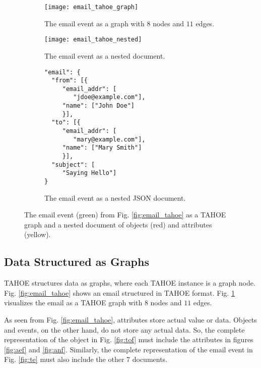 \begin{figure}
    \begin{subfigure}{0.45\textwidth}
        \centering
        \texttt{[image: email\_tahoe\_graph]}
        \caption{The email event as a graph with $8$ nodes and $11$ edges.}
        \label{fig:email_tahoe_graph}
    \end{subfigure}
    \hfill
    \begin{subfigure}{0.23\textwidth}
        \centering
        \texttt{[image: email\_tahoe\_nested]}
        \caption{The email event as a nested document.}
        \label{fig:email_tahoe_nested}
    \end{subfigure}
    \hfill
    \captionsetup[subfigure]{aboveskip=-0.5\baselineskip}
    \begin{subfigure}{0.26\textwidth}
        \footnotesize

        \begin{verbatim}
"email": {
  "from": [{
     "email_addr": [
        "jdoe@example.com"],
     "name": ["John Doe"]
     }],
  "to": [{
     "email_addr": [
        "mary@example.com"],
     "name": ["Mary Smith"]
     }],
  "subject": [
     "Saying Hello"]
}
        \end{verbatim}

        \caption{The email event as a nested JSON document.}
        \label{fig:email_tahoe_data}
    \end{subfigure}
    \caption{The email event (green) from Fig. \ref{fig:email_tahoe} as a TAHOE graph and a nested document of objects (red) and attributes (yellow).}
    \label{fig:email_tahoe_repr}
\end{figure}



\subsection{Data Structured as Graphs}\label{ss:graph}

TAHOE structures data as graphs, where each TAHOE instance is a graph node.  Fig. \ref{fig:email_tahoe} shows an email structured in TAHOE format. Fig. \ref{fig:email_tahoe_graph} visualizes the email as a TAHOE graph with $8$ nodes and $11$ edges.

As seen from Fig. \ref{fig:email_tahoe}, attributes store actual value or data. Objects and events, on the other hand, do not store any actual data. So, the complete representation of the object in Fig. \ref{fig:tof} must include the attributes in figures \ref{fig:aef} and \ref{fig:anf}. Similarly, the complete representation of the email event in Fig. \ref{fig:te} must also include the other $7$ documents.


